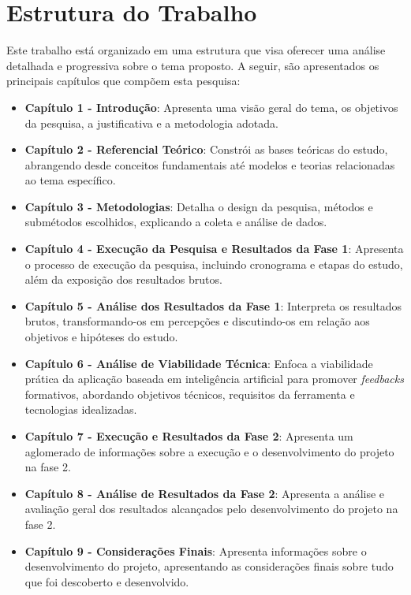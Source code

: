 \section{Estrutura do Trabalho}

Este trabalho está organizado em uma estrutura que visa oferecer uma análise detalhada e progressiva sobre o tema proposto. A seguir, são apresentados os principais capítulos que compõem esta pesquisa:

\begin{itemize}
    \item \textbf{Capítulo 1 - Introdução}: Apresenta uma visão geral do tema, os objetivos da pesquisa, a justificativa e a metodologia adotada.
    
    \item \textbf{Capítulo 2 - Referencial Teórico}: Constrói as bases teóricas do estudo, abrangendo desde conceitos fundamentais até modelos e teorias relacionadas ao tema específico.
    
    \item \textbf{Capítulo 3 - Metodologias}: Detalha o design da pesquisa, métodos e submétodos escolhidos, explicando a coleta e análise de dados.
    
    \item \textbf{Capítulo 4 - Execução da Pesquisa e Resultados da Fase 1}: Apresenta o processo de execução da pesquisa, incluindo cronograma e etapas do estudo, além da exposição dos resultados brutos.
    
    \item \textbf{Capítulo 5 - Análise dos Resultados da Fase 1}: Interpreta os resultados brutos, transformando-os em percepções e discutindo-os em relação aos objetivos e hipóteses do estudo.
    
    \item \textbf{Capítulo 6 - Análise de Viabilidade Técnica}: Enfoca a viabilidade prática da aplicação baseada em inteligência artificial para promover \textit{feedbacks} formativos, abordando objetivos técnicos, requisitos da ferramenta e tecnologias idealizadas.
    
    \item \textbf{Capítulo 7 - Execução e Resultados da Fase 2}: Apresenta um aglomerado de informações sobre a execução e o desenvolvimento do projeto na fase 2.

    \item \textbf{Capítulo 8 - Análise de Resultados da Fase 2}: Apresenta a análise e avaliação geral dos resultados alcançados pelo desenvolvimento do projeto na fase 2.

    \item \textbf{Capítulo 9 - Considerações Finais}: Apresenta informações sobre o desenvolvimento do projeto, apresentando as considerações finais sobre tudo que foi descoberto e desenvolvido.
\end{itemize}

